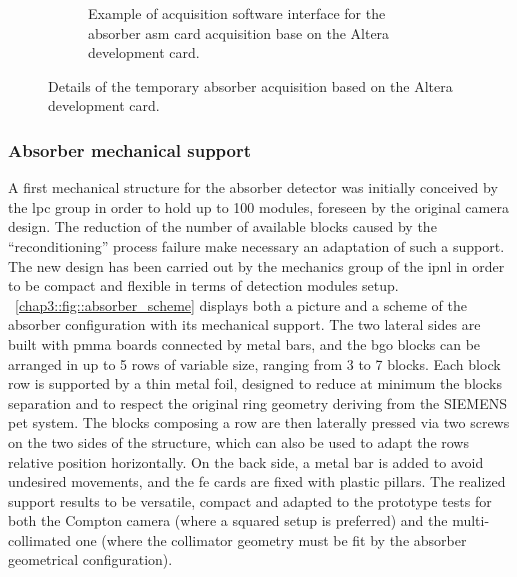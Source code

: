 \begin{figure}
\begin{subfigure}[htbp]{0.5\textwidth}
\caption{Example of acquisition software interface for the absorber \gls{asm} card acquisition base on the Altera development card.}
\label{chap3::fig::softDevelCard} 
\end{subfigure}
\caption{Details of the temporary absorber acquisition based on the Altera development card.}
\label{chap5::fig::AbsorberDevelCards}
\end{figure}

\subsubsection{Absorber mechanical support}\label{chap3::subsubsec::AbsorberMechanics}

A first mechanical structure for the absorber detector was initially conceived by the \gls{lpc} group in order to hold up to 100 modules, foreseen by the original camera design. The reduction of the number of available blocks caused by the \enquote{reconditioning} process failure make necessary an adaptation of such a support. The new design has been carried out by the mechanics group of the \gls{ipnl} in order to be compact and flexible in terms of detection modules setup. \figurename~\ref{chap3::fig::absorber_scheme} displays both a picture and a scheme of the absorber configuration with its mechanical support. The two lateral sides are built with \gls{pmma} boards connected by metal bars, and the \gls{bgo} blocks can be arranged in up to 5 rows of variable size, ranging from 3 to 7 blocks. Each block row is supported by a thin metal foil, designed to reduce at minimum the blocks separation and to respect the original ring geometry deriving from the SIEMENS \gls{pet} system. The blocks composing a row are then laterally pressed via two screws on the two sides of the structure, which can also be used to adapt the rows relative position horizontally. On the back side, a metal bar is added to avoid undesired movements, and the \gls{fe} cards are fixed with plastic pillars. The realized support results to be versatile, compact and adapted to the prototype tests for both the Compton camera (where a squared setup is preferred) and the multi-collimated one (where the collimator geometry must be fit by the absorber geometrical configuration).       

